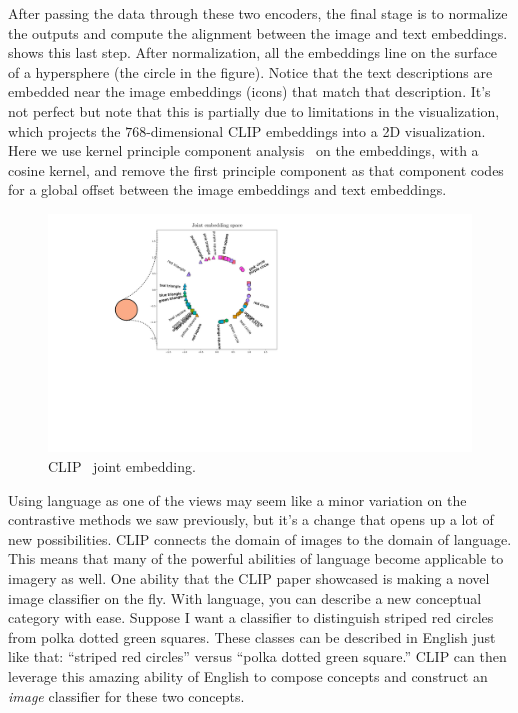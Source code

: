 After passing the data through these two encoders, the final stage is to normalize the outputs and compute the alignment between the image and text embeddings. \Fig{\ref{fig:vision_and_language:clip_shared_embedding}} shows this last step. After normalization, all the embeddings line on the surface of a hypersphere (the circle in the figure). Notice that the text descriptions are embedded near the image embeddings (icons) that match that description. It's not perfect but note that this is partially due to limitations in the visualization, which projects the $768$-dimensional CLIP embeddings into a 2D visualization. Here we use kernel principle component analysis~\cite{scholkopf1998nonlinear} on the embeddings, with a cosine kernel, and remove the first principle component as that component codes for a global offset between the image embeddings and text embeddings.
\begin{figure}[h]
    \centerline{
        \includegraphics[width=0.8\linewidth]{figures/vision_and_language/clip_shared_embedding.pdf}}
    \caption{CLIP~\cite{radford2021learning} joint embedding.}
    \label{fig:vision_and_language:clip_shared_embedding}
\end{figure}

Using language as one of the views may seem like a minor variation on the contrastive methods we saw previously, but it's a change that opens up a lot of new possibilities. CLIP connects the domain of images to the domain of language. This means that many of the powerful abilities of language become applicable to imagery as well. One ability that the CLIP paper showcased is making a novel image classifier on the fly. With language, you can describe a new conceptual category with ease. Suppose I want a classifier to distinguish striped red circles from polka dotted green squares. These classes can be described in English just like that: ``striped red circles'' versus ``polka dotted green square.'' CLIP can then leverage this amazing ability of English to compose concepts and construct an \textit{image} classifier for these two concepts.

